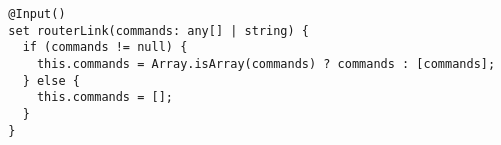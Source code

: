 \begin{verbatim}
  @Input()
  set routerLink(commands: any[] | string) {
    if (commands != null) {
      this.commands = Array.isArray(commands) ? commands : [commands];
    } else {
      this.commands = [];
    }
  }
\end{verbatim}
